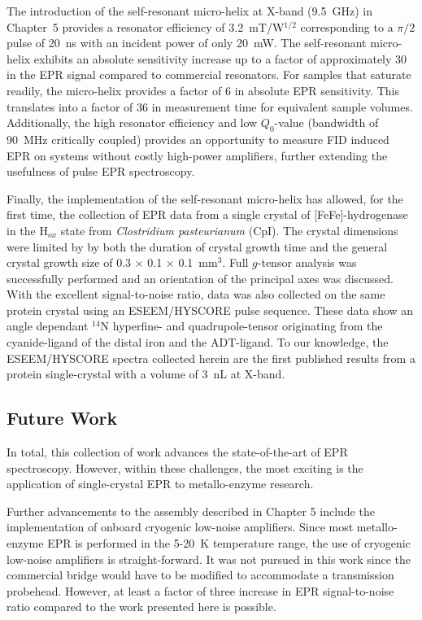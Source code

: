 The introduction of the self-resonant micro-helix at X-band (9.5~GHz) in Chapter~5 provides a resonator efficiency of 3.2~mT/W$^{1/2}$ corresponding to a $\pi/2$ pulse of 20~ns with an incident power of only 20~mW. The self-resonant micro-helix exhibits an absolute sensitivity increase up to a factor of approximately 30 in the EPR signal compared to commercial resonators. For samples that saturate readily, the micro-helix provides a factor of 6 in absolute EPR sensitivity. This translates into a factor of 36 in measurement time for equivalent sample volumes. Additionally, the high resonator efficiency and low $Q_0$-value (bandwidth of 90~MHz critically coupled) provides an opportunity to measure FID induced EPR on systems without costly high-power amplifiers, further extending the usefulness of pulse EPR spectroscopy.

Finally, the implementation of the self-resonant micro-helix has allowed, for the first time, the collection of EPR data from a single crystal of [FeFe]-hydrogenase in the H$_{ox}$ state from {\em Clostridium pasteurianum} (CpI). The crystal dimensions were limited by by both the duration of crystal growth time and the general crystal growth size of 0.3 $\times$ 0.1 $\times$ 0.1~mm$^3$. Full $g$-tensor analysis was successfully performed and an orientation of the principal axes was discussed. With the excellent signal-to-noise ratio, data was also collected on the same protein crystal using an ESEEM/HYSCORE pulse sequence. These data show an angle dependant $^{14}$N hyperfine- and quadrupole-tensor originating from the cyanide-ligand of the distal iron and the ADT-ligand. To our knowledge, the ESEEM/HYSCORE spectra collected herein are the first published results from a protein single-crystal with a volume of 3~nL at X-band. 

\subsection*{Future Work}

In total, this collection of work advances the state-of-the-art of EPR spectroscopy. However, within these challenges, the most exciting is the application of single-crystal EPR to metallo-enzyme research. 

Further advancements to the assembly described in Chapter 5 include the implementation of onboard cryogenic low-noise amplifiers. Since most metallo-enzyme EPR is performed in the 5-20~K temperature range, the use of cryogenic low-noise amplifiers is straight-forward. It was not pursued in this work since the commercial bridge would have to be modified to accommodate a transmission probehead. However, at least a factor of three increase in EPR signal-to-noise ratio compared to the work presented here is possible. \cite{NARKOWICZ201379} 

